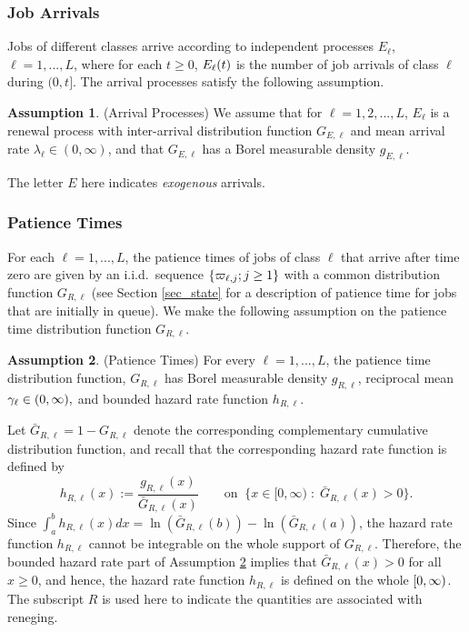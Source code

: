 \documentclass{article}
\theoremstyle{definition}
\newtheorem{assumption}{Assumption}[part]
\numberwithin{equation}{section}
\begin{document}
\subsubsection*{Job Arrivals}
Jobs of different classes arrive according to independent processes $E_\ell$, $\ell=1,...,L$, where for each $t\geq0$, $E_\ell(t)$ is the number of job arrivals of class $\ell$ during $(0,t]$. The arrival processes satisfy the following assumption.

\begin{assumption}\label{asm_arrival}
(Arrival Processes) We assume that for $\ell=1,2,...,L$, $E_\ell$ is a renewal process with inter-arrival distribution function $G_{E,\ell}$ and mean arrival rate $\lambda_\ell\in(0,\infty)$, and that $G_{E,\ell}$ has a Borel measurable density $g_{E,\ell}$.
\end{assumption}
\noindent The letter $E$ here indicates \textit{exogenous} arrivals. 

\subsubsection*{Patience Times}
For each $\ell=1,...,L$, the patience times of jobs of class $\ell$ that arrive after time zero are given by an i.i.d.\ sequence $\{\varpi_{\ell,j};j\geq1\}$ with a common distribution function $G_{R,\ell}$ (see Section \ref{sec_state} for a description of patience time for jobs that are initially in queue). We make the following assumption on the patience time distribution function $G_{R,\ell}$.
\begin{assumption}\label{asm_patience}
  (Patience Times) For every $\ell=1,...,L$, the patience time distribution function, $G_{R,\ell}$ has Borel measurable density $g_{R,\ell}$, reciprocal mean $\gamma_{\ell}\in(0,\infty),$ and bounded hazard rate function $h_{R,\ell}$.
\end{assumption}
Let $\bar G_{R,\ell}=1-G_{R,\ell}$ denote the corresponding complementary cumulative distribution function, and recall that the corresponding hazard rate function is defined by
\[
h_{R,\ell}(x):=\frac{g_{R,\ell}(x)}{\bar G_{R,\ell}(x)}\quad\quad \text{on} \;\;\{x\in[0,\infty)\;:\; \bar G_{R,\ell}(x)> 0\}.
\]
Since $\int_a^bh_{R,\ell}(x)dx = \ln(\bar G_{R,\ell}(b)) - \ln(\bar G_{R,\ell}(a))$, the hazard rate function $h_{R,\ell}$ cannot be integrable on the whole support of $G_{R,\ell}$. Therefore, the bounded hazard rate part of Assumption \ref{asm_patience} implies that  $\bar G_{R,\ell}(x)>0$ for all $x\geq0$, and hence, the hazard rate function $h_{R,\ell}$ is defined on the whole $[0,\infty)$. The subscript $R$ is used here to indicate the quantities are associated with reneging. 
\end{document}

